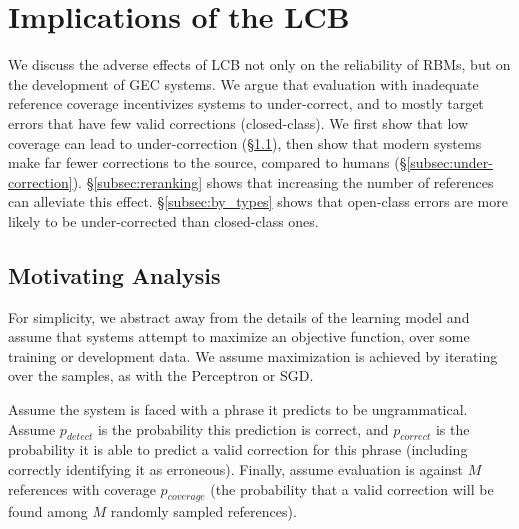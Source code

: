 \documentclass[11pt, a4paper]{article}
\newcommand{\lc}[1]{\footnote{\color{blue}LC: #1}}
\begin{document}


\section{Implications of the LCB}\label{sec:formal_conservatism}

We discuss the adverse effects of LCB not only on the reliability of RBMs, but on the development
of GEC systems.
We argue that evaluation with inadequate reference coverage incentivizes systems to under-correct,
and to mostly target errors that have few valid corrections (closed-class).
We first show that low coverage can lead to under-correction (\S\ref{subsec:motivating_analysis}),
then show that modern systems make far fewer corrections to the source, compared to humans (\S\ref{subsec:under-correction}).
\S\ref{subsec:reranking} shows that increasing the number of references can alleviate this effect.
\S\ref{subsec:by_types} shows that open-class errors are more likely to be under-corrected than closed-class ones.

\subsection{Motivating Analysis}\label{subsec:motivating_analysis}

For simplicity, we abstract away from the details of the learning model and assume 
that systems attempt to maximize an objective function, 
over some training or development data. 
We assume maximization is achieved by iterating over the samples, as with the Perceptron or SGD.

Assume the system is faced with a phrase it predicts to be ungrammatical. 
Assume $p_{detect}$ is the probability this prediction is correct, and
$p_{correct}$ is the probability it is able to predict
a valid correction for this phrase (including correctly identifying it as erroneous).
Finally, assume evaluation is
against $M$ references with coverage $p_{coverage}$
(the probability that
a valid correction will be found among $M$ randomly sampled references).
\end{document}
